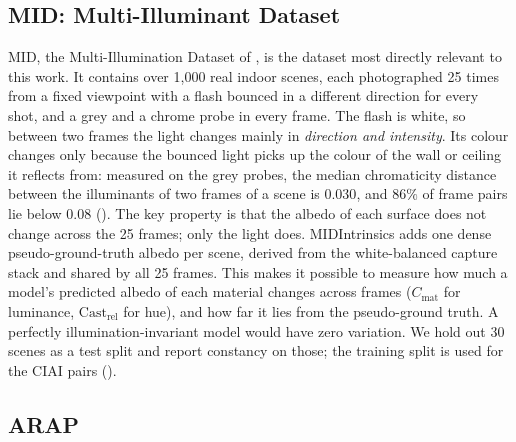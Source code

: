 \subsection{MID: Multi-Illuminant Dataset}
\label{sec:mid_dataset}

MID, the Multi-Illumination Dataset of , is the dataset
most directly relevant to this work.
It contains over 1{,}000 real indoor scenes, each photographed 25 times from a
fixed viewpoint with a flash bounced in a different direction for every shot, and
a grey and a chrome probe in every frame.
The flash is white, so between two frames the light changes mainly in
\emph{direction and intensity}. Its colour changes only because the bounced light picks up
the colour of the wall or ceiling it reflects from: measured on the grey probes, the median
chromaticity distance between the illuminants of two frames of a scene is $0.030$, and
$86\%$ of frame pairs lie below $0.08$ ().
The key property is that the albedo of each surface does not change across the 25
frames; only the light does. MIDIntrinsics  adds one dense
pseudo-ground-truth albedo per scene, derived from the white-balanced capture stack and
shared by all 25 frames. This makes it possible to measure how much a model's predicted
albedo of each material changes across frames ($C_{\text{mat}}$ for luminance,
$\text{Cast}_{\text{rel}}$ for hue), and how far it lies from the pseudo-ground truth.
A perfectly illumination-invariant model would have zero variation.
We hold out 30 scenes as a test split and report constancy on those; the training
split is used for the CIAI pairs ().

\subsection{ARAP}
\label{sec:arap_dataset}

